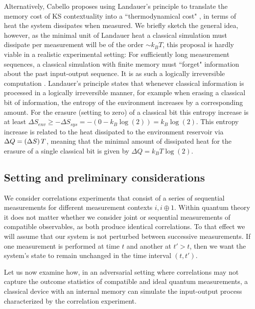 Alternatively, Cabello proposes using Landauer's principle \cite{Cabello2018} to translate the memory cost of KS contextuality into a ``thermodynamical cost" \cite{Wiesner2012,Cabello2016}, in terms of heat the system dissipates when measured. We briefly sketch the general idea, however, as the minimal unit of Landauer heat a classical simulation must dissipate per measurement will be of the order $\sim k_BT$, this proposal is hardly viable in a realistic experimental setting:
For sufficiently long measurement sequences, a classical simulation with finite memory must ``forget" information about the past input-output sequence. It is as such a logically irreversible computation \cite{Wiesner2012}.
Landauer's principle states that whenever classical information is processed in a logically irreversible manner, for example when erasing a classical bit of information, the entropy of the environment increases by a corresponding amount. For the erasure (setting to zero) of a classical bit this entropy increase is at least $\Delta S_{env}\geq -\Delta S_{sys} = -(0-k_B\log(2))=k_B\log(2)$. This entropy increase is related to the heat dissipated to the environment reservoir via $\Delta Q= (\Delta S)\thinspace T$, meaning that the minimal amount of dissipated heat for the erasure of a single classical bit is given by $\Delta Q = k_B T \log(2)$.

\subsection{Setting and preliminary considerations}
We consider correlations experiments that consist of a series of sequential measurements for different measurement contexts $i,i\oplus 1$. Within quantum theory it does not matter whether we consider joint or sequential measurements of compatible observables, as both produce identical correlations. To that effect we will assume that our system is not perturbed between successive measurements. If one measurement is performed at time $t$ and another at $t' > t$, then we want the system's state to remain unchanged in the time interval $(t, t')$.

Let us now examine how, in an adversarial setting where correlations may not capture the outcome statistics of compatible and ideal quantum measurements, a classical device with an internal memory can simulate the input-output process characterized by the correlation experiment.

